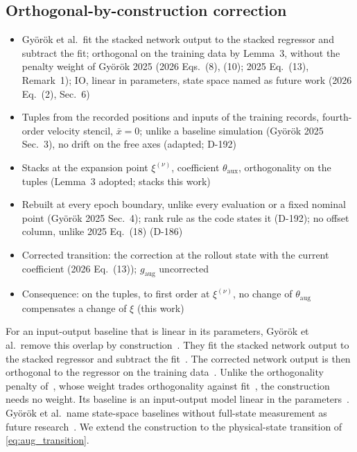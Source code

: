 \subsection{Orthogonal-by-construction correction}\label{sec:obc_map}
\ifdraft
\begin{itemize}
\item Gy\"or\"ok et al.\ fit the stacked network output to the stacked regressor and subtract the fit; orthogonal on the training data by Lemma~3, without the penalty weight of Gy\"or\"ok 2025 (2026 Eqs.~(8), (10); 2025 Eq.~(13), Remark~1); IO, linear in parameters, state space named as future work (2026 Eq.~(2), Sec.~6)
\item Tuples from the recorded positions and inputs of the training records, fourth-order velocity stencil, $\bar x=0$; unlike a baseline simulation (Gy\"or\"ok 2025 Sec.~3), no drift on the free axes (adapted; D-192)
\item Stacks at the expansion point $\xi^{(\nu)}$, coefficient $\theta_{\mathrm{aux}}$, orthogonality on the tuples (Lemma~3 adopted; stacks this work)
\item Rebuilt at every epoch boundary, unlike every evaluation or a fixed nominal point (Gy\"or\"ok 2025 Sec.~4); rank rule as the code states it (D-192); no offset column, unlike 2025 Eq.~(18) (D-186)
\item Corrected transition: the correction at the rollout state with the current coefficient (2026 Eq.~(13)); $g_{\mathrm{aug}}$ uncorrected
\item Consequence: on the tuples, to first order at $\xi^{(\nu)}$, no change of $\theta_{\mathrm{aug}}$ compensates a change of $\xi$ (this work)
\end{itemize}
\fi

For an input-output baseline that is linear in its parameters, Gy\"or\"ok et
al.\ remove this overlap by construction~\cite[Sec.~3.2]{gyorok2026obc}.
They fit the stacked network output to the stacked regressor and subtract the
fit~\cite[Eqs.~(8), (10)]{gyorok2026obc}.
The corrected network output is then orthogonal to the regressor on the
training data~\cite[Lemma~3]{gyorok2026obc}.
Unlike the orthogonality penalty of~\cite[Eq.~(13)]{gyorok2025l4dc}, whose
weight trades orthogonality against fit~\cite[Remark~1]{gyorok2025l4dc}, the
construction needs no weight.
Its baseline is an input-output model linear in the
parameters~\cite[Eq.~(2)]{gyorok2026obc}.
Gy\"or\"ok et al.\ name state-space baselines without full-state measurement
as future research~\cite[Sec.~6]{gyorok2026obc}.
We extend the construction to the physical-state transition of
\eqref{eq:aug_transition}.

